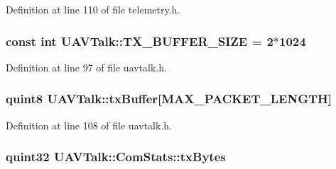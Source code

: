 \-Definition at line 110 of file telemetry.\-h.

\hypertarget{group___u_a_v_talk_plugin_gaa84c0f2f2a83872a6f82f00969d9ddff}{
\subsubsection[{\-T\-X\-\_\-\-B\-U\-F\-F\-E\-R\-\_\-\-S\-I\-Z\-E}]{\setlength{\rightskip}{0pt plus 5cm}const int {\bf \-U\-A\-V\-Talk\-::\-T\-X\-\_\-\-B\-U\-F\-F\-E\-R\-\_\-\-S\-I\-Z\-E} = 2$\ast$1024}}\label{group___u_a_v_talk_plugin_gaa84c0f2f2a83872a6f82f00969d9ddff}


\-Definition at line 97 of file uavtalk.\-h.

\hypertarget{group___u_a_v_talk_plugin_ga7f0eb8c42215b435a77b84d7ffdbbfc3}{
\subsubsection[{tx\-Buffer}]{\setlength{\rightskip}{0pt plus 5cm}quint8 {\bf \-U\-A\-V\-Talk\-::tx\-Buffer}\mbox{[}\-M\-A\-X\-\_\-\-P\-A\-C\-K\-E\-T\-\_\-\-L\-E\-N\-G\-T\-H\mbox{]}}}\label{group___u_a_v_talk_plugin_ga7f0eb8c42215b435a77b84d7ffdbbfc3}


\-Definition at line 108 of file uavtalk.\-h.

\hypertarget{group___u_a_v_talk_plugin_ga6ab32543081346e61bdc67874617d3e1}{
\subsubsection[{tx\-Bytes}]{\setlength{\rightskip}{0pt plus 5cm}quint32 {\bf \-U\-A\-V\-Talk\-::\-Com\-Stats\-::tx\-Bytes}}}\label{group___u_a_v_talk_plugin_ga6ab32543081346e61bdc67874617d3e1}


